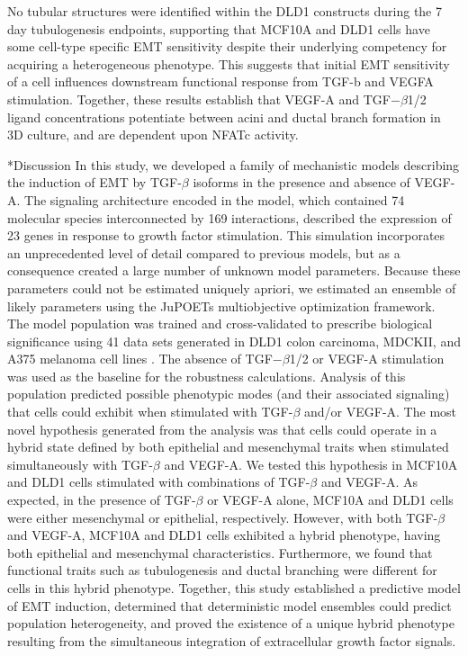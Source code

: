 \documentclass[12pt]{article}
\makeatletter
\renewcommand\section{\@startsection
	{subsection}{2}{0mm}
	{-0.2in}
	{0.05\baselineskip}
	{\normalfont\large\bfseries}}
\makeatother
\begin{document}
No tubular structures were identified within the DLD1 constructs during the 7 day tubulogenesis endpoints, supporting that MCF10A and DLD1 cells have some cell-type specific EMT sensitivity despite their underlying competency for acquiring a heterogeneous phenotype. This suggests that initial EMT sensitivity of a cell influences downstream functional response from TGF-b and VEGFA stimulation.
Together, these results establish that VEGF-A and TGF$-\beta$1/2 ligand concentrations potentiate between acini and ductal branch formation in 3D culture, and are dependent upon NFATc activity.


\clearpage

\section*{Discussion}
In this study, we developed a family of mechanistic models describing the induction of EMT by TGF-$\beta$ isoforms in the presence and absence of VEGF-A.
The signaling architecture encoded in the model, which contained 74 molecular species interconnected by 169 interactions,
described the expression of 23 genes in response to growth factor stimulation.
This simulation incorporates an unprecedented level of detail compared to previous models, but as a consequence created a large number of unknown model parameters.
Because these parameters could not be estimated uniquely apriori, we estimated an ensemble of likely parameters using the JuPOETs multiobjective optimization framework.
The model population was trained and cross-validated to prescribe biological significance using 41 data sets generated in DLD1 colon carcinoma, MDCKII, and A375 melanoma cell lines \citep{Medici:2008fk}.
The absence of TGF$-\beta$1/2 or VEGF-A stimulation was used as the baseline for the robustness calculations.
Analysis of this population predicted possible phenotypic modes (and their associated signaling) that cells could exhibit when stimulated with TGF-$\beta$ and/or VEGF-A.
The most novel hypothesis generated from the analysis was that cells could operate in a hybrid state defined by both epithelial and mesenchymal traits when stimulated simultaneously with TGF-$\beta$ and VEGF-A.
We tested this hypothesis in MCF10A and DLD1 cells stimulated with combinations of TGF-$\beta$ and VEGF-A.
As expected, in the presence of TGF-$\beta$ or VEGF-A alone, MCF10A and DLD1 cells were either mesenchymal or epithelial, respectively.
However, with both TGF-$\beta$ and VEGF-A, MCF10A and DLD1 cells exhibited a hybrid phenotype, having both epithelial and mesenchymal characteristics.
Furthermore, we found that functional traits such as tubulogenesis and ductal branching were different for cells in this hybrid phenotype.
Together, this study established a predictive model of EMT induction, determined that deterministic model ensembles could predict population heterogeneity, and proved the existence of a unique hybrid phenotype resulting from the simultaneous integration of extracellular growth factor signals.
\end{document}
